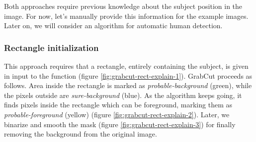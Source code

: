 \medskip

Both approaches require previous knowledge about the subject position in the image. For now, let’s manually provide this information for the example images. Later on, we will consider an algorithm for automatic human detection.


\subsubsection{Rectangle initialization}
\label{subsec:masking-grabcut-rect}

This approach requires that a rectangle, entirely containing the subject, is given in input to the function (figure \ref{fig:grabcut-rect-explain-1}). GrabCut proceeds as follows. Area inside the rectangle is marked as \textit{probable-background} (green), while the pixels outside are \textit{sure-background} (blue). As the algorithm keeps going, it finds pixels inside the rectangle which can be foreground, marking them as \textit{probable-foreground} (yellow) (figure \ref{fig:grabcut-rect-explain-2}). Later, we binarize and smooth the mask (figure \ref{fig:grabcut-rect-explain-3}) for finally removing the background from the original image.

